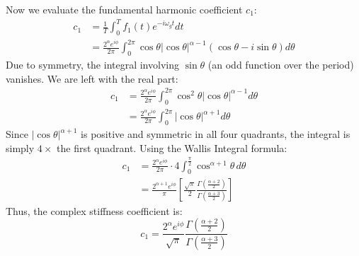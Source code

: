 \documentclass[10pt,twoside]{report}
\begin{document}
Now we evaluate the fundamental harmonic coefficient $c_1$:
\begin{align*}
    c_1 &= \frac{1}{T} \int_{0}^{T} f_1(t) e^{-i\omega_g t} dt \\
        &= \frac{2^\alpha e^{i\phi}}{2\pi} \int_{0}^{2\pi} \cos\theta |\cos\theta|^{\alpha-1} (\cos\theta - i\sin\theta) d\theta
\end{align*}
Due to symmetry, the integral involving $\sin\theta$ (an odd function over the period) vanishes. We are left with the real part:
\begin{align*}
    c_1 &= \frac{2^\alpha e^{i\phi}}{2\pi} \int_{0}^{2\pi} \cos^2\theta |\cos\theta|^{\alpha-1} d\theta \\
        &= \frac{2^\alpha e^{i\phi}}{2\pi} \int_{0}^{2\pi} |\cos\theta|^{\alpha+1} d\theta
\end{align*}
Since $|\cos\theta|^{\alpha+1}$ is positive and symmetric in all four quadrants, the integral is simply $4 \times$ the first quadrant. Using the Wallis Integral formula:
\begin{align*}
    c_1 &= \frac{2^\alpha e^{i\phi}}{2\pi} \cdot 4 \int_{0}^{\frac{\pi}{2}} \cos^{\alpha+1}\theta \, d\theta \\
        &= \frac{2^{\alpha+1} e^{i\phi}}{\pi} \left[ \frac{\sqrt{\pi}}{2} \frac{\Gamma\left(\frac{\alpha+2}{2}\right)}{\Gamma\left(\frac{\alpha+3}{2}\right)} \right]
\end{align*}
Thus, the complex stiffness coefficient is:
\begin{equation}
    c_1 = \frac{2^\alpha e^{i\phi}}{\sqrt{\pi}} \frac{\Gamma\left(\frac{\alpha+2}{2}\right)}{\Gamma\left(\frac{\alpha+3}{2}\right)}
\end{equation}
\end{document}
